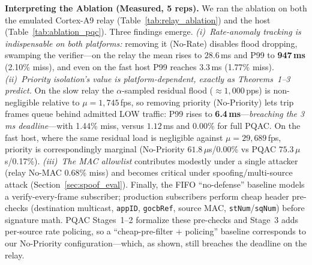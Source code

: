 \documentclass[journal]{IEEEtran}
\begin{document}
\textbf{Interpreting the Ablation (Measured, 5 reps).} We ran the ablation on both the emulated Cortex-A9 relay (Table~\ref{tab:relay_ablation}) and the host (Table~\ref{tab:ablation_pqc}). Three findings emerge. \emph{(i)~Rate-anomaly tracking is indispensable on both platforms:} removing it (No-Rate) disables flood dropping, swamping the verifier---on the relay the mean rises to $28.6$\,ms and P99 to \textbf{947\,ms} (2.10\% miss), and even on the fast host P99 reaches $3.3$\,ms (1.77\% miss). \emph{(ii)~Priority isolation's value is platform-dependent, exactly as Theorems~1--3 predict.} On the slow relay the $\alpha$-sampled residual flood ($\approx 1{,}000$\,pps) is non-negligible relative to $\mu=1{,}745$\,fps, so removing priority (No-Priority) lets trip frames queue behind admitted LOW traffic: P99 rises to \textbf{6.4\,ms}---\emph{breaching the 3\,ms deadline}---with 1.44\% miss, versus $1.12$\,ms and 0.00\% for full PQAC. On the fast host, where the same residual load is negligible against $\mu=29{,}689$\,fps, priority is correspondingly marginal (No-Priority $61.8\,\mu$s/0.00\% vs PQAC $75.3\,\mu$s/0.17\%). \emph{(iii)~The MAC allowlist} contributes modestly under a single attacker (relay No-MAC 0.68\% miss) and becomes critical under spoofing/multi-source attack (Section~\ref{sec:spoof_eval}). Finally, the FIFO ``no-defense'' baseline models a verify-every-frame subscriber; production subscribers perform cheap header pre-checks (destination multicast, \texttt{appID}, \texttt{gocbRef}, source MAC, \texttt{stNum}/\texttt{sqNum}) before signature math. PQAC Stages~1--2 formalize these pre-checks and Stage~3 adds per-source rate policing, so a ``cheap-pre-filter + policing'' baseline corresponds to our No-Priority configuration---which, as shown, still breaches the deadline on the relay.

\begin{table}[t]
\centering
\caption{Measured PQAC Component Ablation on the Emulated Cortex-A9 Relay ($\overline{S}=573\,\mu$s, 100K\,pps, 5 reps; mean $\pm 1\sigma$)}
\label{tab:relay_ablation}
\scriptsize
{}
\end{table}
\end{document}
